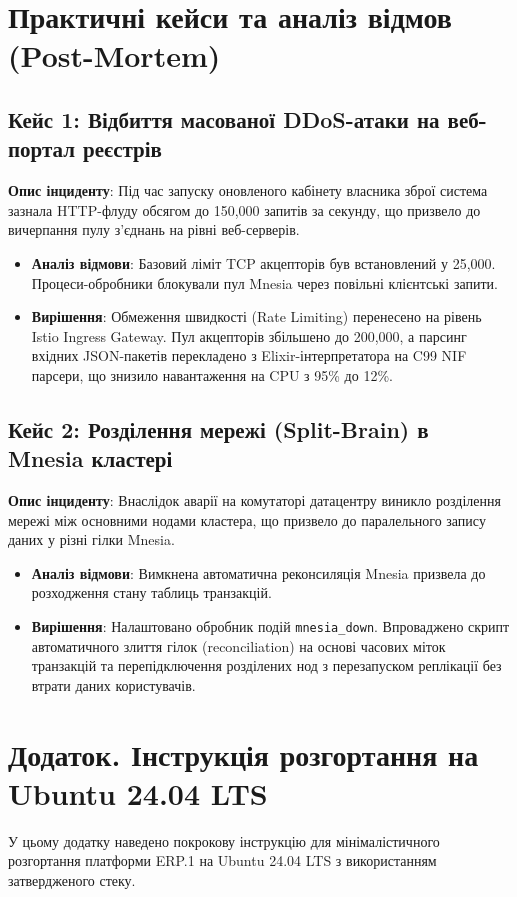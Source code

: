 \section{Практичні кейси та аналіз відмов (Post-Mortem)}

\subsection{Кейс 1: Відбиття масованої DDoS-атаки на веб-портал реєстрів}
\textbf{Опис інциденту}: Під час запуску оновленого кабінету власника зброї система зазнала HTTP-флуду обсягом до 150,000 запитів за секунду, що призвело до вичерпання пулу з'єднань на рівні веб-серверів.
\begin{itemize}
    \item \textbf{Аналіз відмови}: Базовий ліміт TCP акцепторів був встановлений у 25,000. Процеси-обробники блокували пул Mnesia через повільні клієнтські запити.
    \item \textbf{Вирішення}: Обмеження швидкості (Rate Limiting) перенесено на рівень Istio Ingress Gateway. Пул акцепторів збільшено до 200,000, а парсинг вхідних JSON-пакетів перекладено з Elixir-інтерпретатора на C99 NIF парсери, що знизило навантаження на CPU з 95\% до 12\%.
\end{itemize}

\subsection{Кейс 2: Розділення мережі (Split-Brain) в Mnesia кластері}
\textbf{Опис інциденту}: Внаслідок аварії на комутаторі датацентру виникло розділення мережі між основними нодами кластера, що призвело до паралельного запису даних у різні гілки Mnesia.
\begin{itemize}
    \item \textbf{Аналіз відмови}: Вимкнена автоматична реконсиляція Mnesia призвела до розходження стану таблиць транзакцій.
    \item \textbf{Вирішення}: Налаштовано обробник подій \texttt{mnesia\_down}. Впроваджено скрипт автоматичного злиття гілок (reconciliation) на основі часових міток транзакцій та перепідключення розділених нод з перезапуском реплікації без втрати даних користувачів.
\end{itemize}

\section{Додаток. Інструкція розгортання на Ubuntu 24.04 LTS}
\label{appendix:deploy}
У цьому додатку наведено покрокову інструкцію для мінімалістичного розгортання платформи ERP.1 на Ubuntu 24.04 LTS з використанням затвердженого стеку.

